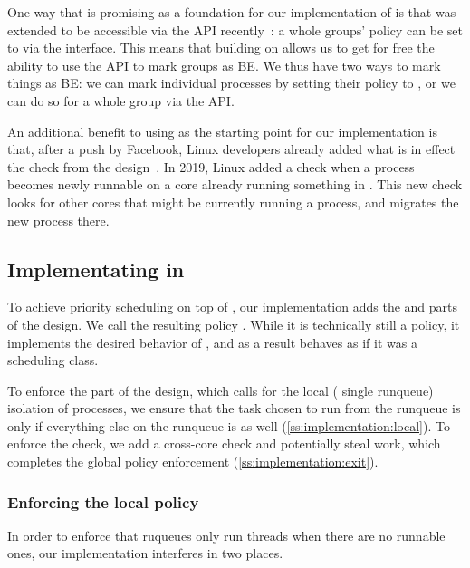 One way that \schedidle{} is promising as a foundation for our implementation of
\beclass{} is that \schedidle{} was extended to be accessible via the \cgroups{}
API recently~\cite{lkml-idle-cgroup}: a whole groups' policy can be set to
\schedidle{} via the \cgroups{} interface. This means that building on
\schedidle{} allows us to get for free the ability to use the \cgroups{} API to
mark groups as BE. We thus have two ways to mark things as BE: we can mark
individual processes by setting their policy to \schedidle{}, or we can do so
for a whole group via the \cgroups{} API.

An additional benefit to using \schedidle{} as the starting point for our
implementation is that, after a push by Facebook, Linux developers already added
what is in effect the \entry{} check from the \beclass{}
design~\cite{fixing-idle-article}. In 2019, Linux added a check when a
\schednormal{} process becomes newly runnable on a core already running something
in \schednormal{}. This new check looks for other cores that might be currently
running a \schedidle{} process, and migrates the new process there.

\subsection{Implementating \beclass{} in \schedbe{}}

To achieve priority scheduling on top of \schedidle{}, our implementation adds
the \local{} and \exit{} parts of the \beclass{} design. We call the resulting
policy \schedbe{}. While it is technically still a policy, it implements the
desired behavior of \beclass{}, and as a result behaves as if it was a
scheduling class.

To enforce the \local{} part of the design, which calls for the local (\ie{}
single runqueue) isolation of \schedbe{} processes, we ensure that the task
chosen to run from the runqueue is only \schedbe{} if everything else on the
runqueue is as well (\autoref{ss:implementation:local}). To enforce the \exit{}
check, we add a cross-core check and potentially steal work, which completes the
global policy enforcement (\autoref{ss:implementation:exit}).

\subsubsection{Enforcing the local policy}\label{ss:implementation:local}

In order to enforce that ruqueues only run \schedbe{} threads when there are no
runnable \schednormal{} ones, our implementation interferes in two places. 

